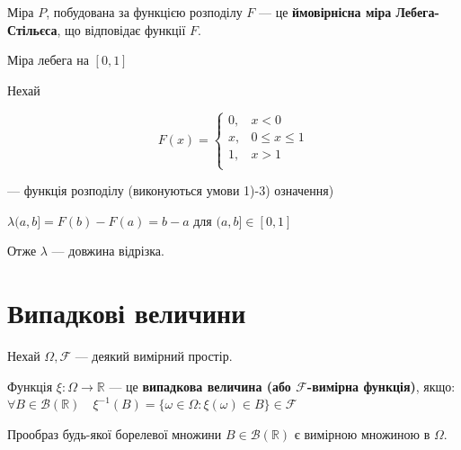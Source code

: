 \begin{definition}
    Міра $P$, побудована за функцією розподілу $F$ --- це \textbf{ймовірнісна міра
    Лебега-Стільєса}, що відповідає функції $F$.
\end{definition}

\begin{example} Міра лебега на $[0, 1]$
    
    Нехай 
    
    $$F(x) = \left\{ \begin{array}{ll}
        0, & x < 0  \\
        x, & 0 \leqslant x \leqslant 1 \\
        1, & x > 1  \\
    \end{array} \right.$$
    
    --- функція розподілу (виконуються умови 1)-3) означення)

    \beautifulImage

    $\lambda(a, b] = F(b) - F(a) = b-a$
    для $(a, b] \in [0, 1]$
    
    Отже $\lambda$ --- довжина відрізка.
\end{example}

\section{Випадкові величини}

Нехай $\Omega, \mathcal{F}$ --- деякий вимірний простір.

\begin{definition}
    Функція $\xi: \Omega \rightarrow \mathbb{R}$ --- це \textbf{випадкова величина
    (або $\mathcal{F}$-вимірна функція)},
    якщо: $\forall B \in \mathcal{B}(\mathbb{R})
    \quad \xi^{-1}(B) = \{\omega \in \Omega: \xi(\omega) \in B\} \in \mathcal{F}$
    
    Прообраз будь-якої борелевої множини $B \in \mathcal{B}(\mathbb{R})$ є вимірною
    множиною в $\Omega$.
\end{definition}

